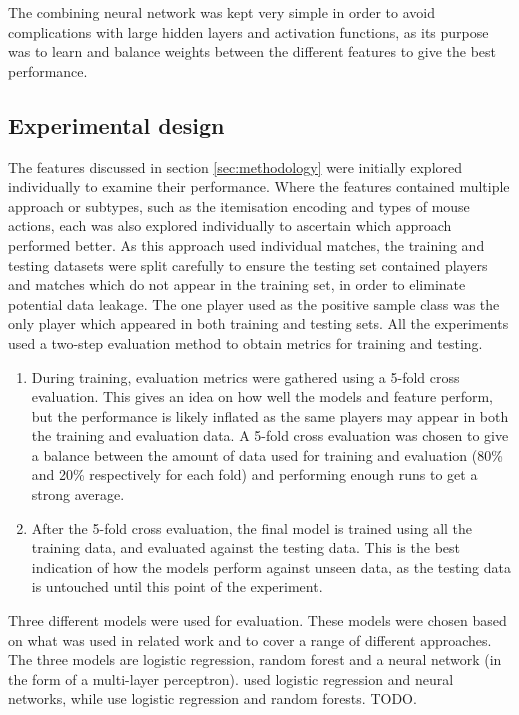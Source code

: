 \documentclass[Report.tex]{subfiles}
\begin{document}
The combining neural network was kept very simple in order to avoid complications with large hidden layers and activation functions, as its purpose was to learn and balance weights between the different features to give the best performance. %


\subsection{Experimental design}\label{sec:game-experimental}
The features discussed in section \ref{sec:methodology} were initially explored individually to examine their performance. Where the features contained multiple approach or subtypes, such as the itemisation encoding and types of mouse actions, each was also explored individually to ascertain which approach performed better. As this approach used individual matches, the training and testing datasets were split carefully to ensure the testing set contained players and matches which do not appear in the training set, in order to eliminate potential data leakage. The one player used as the positive sample class was the only player which appeared in both training and testing sets. All the experiments used a two-step evaluation method to obtain metrics for training and testing.
\begin{enumerate}
\item During training, evaluation metrics were gathered using a 5-fold cross evaluation. This gives an idea on how well the models and feature perform, but the performance is likely inflated as the same players may appear in both the training and evaluation data. A 5-fold cross evaluation was chosen to give a balance between the amount of data used for training and evaluation (80\% and 20\% respectively for each fold) and performing enough runs to get a strong average. 
\item After the 5-fold cross evaluation, the final model is trained using all the training data, and evaluated against the testing data. This is the best indication of how the models perform against unseen data, as the testing data is untouched until this point of the experiment. 
\end{enumerate}
Three different models were used for evaluation. These models were chosen based on what was used in related work \cite{TODO} and to cover a range of different approaches. The three models are logistic regression, random forest and a neural network (in the form of a multi-layer perceptron). \cite{TODO} used logistic regression and neural networks, while \cite{TODO} use logistic regression and random forests.  TODO. 
\end{document}
